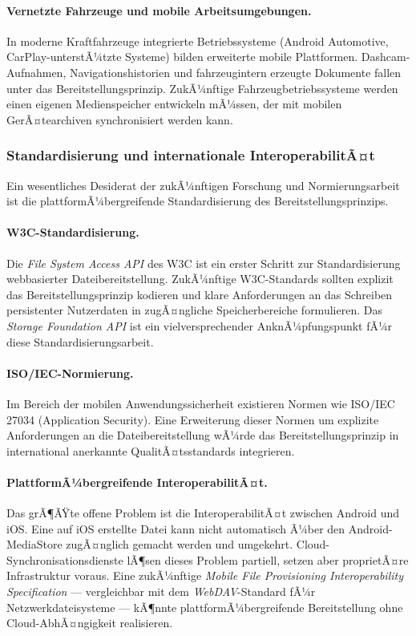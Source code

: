 ﻿\documentclass[12pt, a4paper]{article}
\begin{document}
\paragraph{Vernetzte Fahrzeuge und mobile Arbeitsumgebungen.}
In moderne Kraftfahrzeuge integrierte Betriebssysteme (Android Automotive,
CarPlay-unterstÃ¼tzte Systeme) bilden erweiterte mobile Plattformen. Dashcam-Aufnahmen,
Navigationshistorien und fahrzeugintern erzeugte Dokumente fallen unter das
Bereitstellungsprinzip. ZukÃ¼nftige Fahrzeugbetriebssysteme werden einen eigenen
Medienspeicher entwickeln mÃ¼ssen, der mit mobilen GerÃ¤tearchiven synchronisiert
werden kann.

\subsubsection{Standardisierung und internationale InteroperabilitÃ¤t}

Ein wesentliches Desiderat der zukÃ¼nftigen Forschung und Normierungsarbeit ist die
plattformÃ¼bergreifende Standardisierung des Bereitstellungsprinzips.

\paragraph{W3C-Standardisierung.}
Die \emph{File System Access API} des W3C ist ein erster Schritt zur Standardisierung
webbasierter Dateibereitstellung. ZukÃ¼nftige W3C-Standards sollten explizit das
Bereitstellungsprinzip kodieren und klare Anforderungen an das Schreiben persistenter
Nutzerdaten in zugÃ¤ngliche Speicherbereiche formulieren. Das \emph{Storage Foundation API}
ist ein vielversprechender AnknÃ¼pfungspunkt fÃ¼r diese Standardisierungsarbeit.

\paragraph{ISO/IEC-Normierung.}
Im Bereich der mobilen Anwendungssicherheit existieren Normen wie ISO/IEC\,27034
(Application Security). Eine Erweiterung dieser Normen um explizite Anforderungen an
die Dateibereitstellung wÃ¼rde das Bereitstellungsprinzip in international anerkannte
QualitÃ¤tsstandards integrieren.

\paragraph{PlattformÃ¼bergreifende InteroperabilitÃ¤t.}
Das grÃ¶ÃŸte offene Problem ist die InteroperabilitÃ¤t zwischen Android und iOS. Eine
auf iOS erstellte Datei kann nicht automatisch Ã¼ber den Android-MediaStore zugÃ¤nglich
gemacht werden und umgekehrt. Cloud-Synchronisationsdienste lÃ¶sen dieses Problem
partiell, setzen aber proprietÃ¤re Infrastruktur voraus. Eine zukÃ¼nftige
\emph{Mobile File Provisioning Interoperability Specification} --- vergleichbar mit
dem \emph{WebDAV}-Standard fÃ¼r Netzwerkdateisysteme --- kÃ¶nnte plattformÃ¼bergreifende
Bereitstellung ohne Cloud-AbhÃ¤ngigkeit realisieren.
\end{document}
